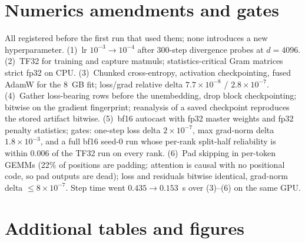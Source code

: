 \documentclass{article}
\begin{document}
\section{Numerics amendments and gates}\label{app:amend}
All registered before the first run that used them; none introduces a new hyperparameter.
(1)~lr $10^{-3}\to10^{-4}$ after 300-step divergence probes at $d{=}4096$.
(2)~TF32 for training and capture matmuls; statistics-critical Gram matrices strict fp32 on CPU\@.
(3)~Chunked cross-entropy, activation checkpointing, fused AdamW for the 8~GB fit;
loss/grad relative delta $7.7\times10^{-8}$ / $2.8\times10^{-7}$.
(4)~Gather loss-bearing rows before the unembedding, drop block checkpointing; bitwise on
the gradient fingerprint; reanalysis of a saved checkpoint reproduces the stored artifact bitwise.
(5)~bf16 autocast with fp32 master weights and fp32 penalty statistics; gates: one-step
loss delta $2\times10^{-7}$, max grad-norm delta $1.8\times10^{-3}$, and a full bf16
seed-0 run whose per-rank split-half reliability is within $0.006$ of the TF32 run on every rank.
(6)~Pad skipping in per-token GEMMs (22\% of positions are padding; attention is causal
with no positional code, so pad outputs are dead); loss and residuals bitwise identical,
grad-norm delta $\le8\times10^{-7}$.
Step time went $0.435\to0.153$~s over (3)--(6) on the same GPU\@.

\section{Additional tables and figures}
\end{document}
